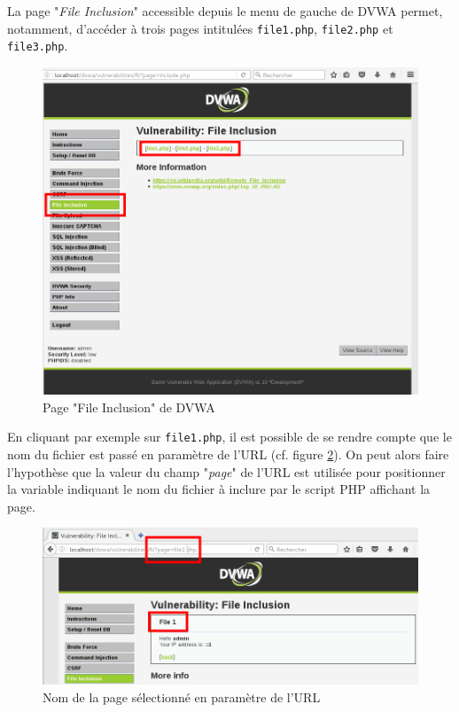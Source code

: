 La page "\textit{File Inclusion}" accessible depuis le menu de gauche de DVWA permet, notamment, d'accéder à trois pages intitulées \texttt{file1.php}, \texttt{file2.php} et \texttt{file3.php}. 

\begin{figure}[!h]
\begin{center}
\includegraphics[scale=.34]{images/fi1.png}

\caption{Page "File Inclusion" de DVWA}
\label{fi_dvwa1}
\end{center}
\end{figure}

En cliquant par exemple sur \texttt{file1.php}, il est possible de se rendre compte que le nom du fichier est passé en paramètre de l'URL (cf. figure \ref{fi_dvwa2}). On peut alors faire l'hypothèse que la valeur du champ "\textit{page}" de l'URL est utilisée pour positionner la variable indiquant le nom du fichier à inclure par le script PHP affichant la page. 

\begin{figure}[!h]
\begin{center}
\includegraphics[scale=.5]{images/fi2.png}

\caption{Nom de la page sélectionné en paramètre de l'URL}
\label{fi_dvwa2}
\end{center}
\end{figure}

